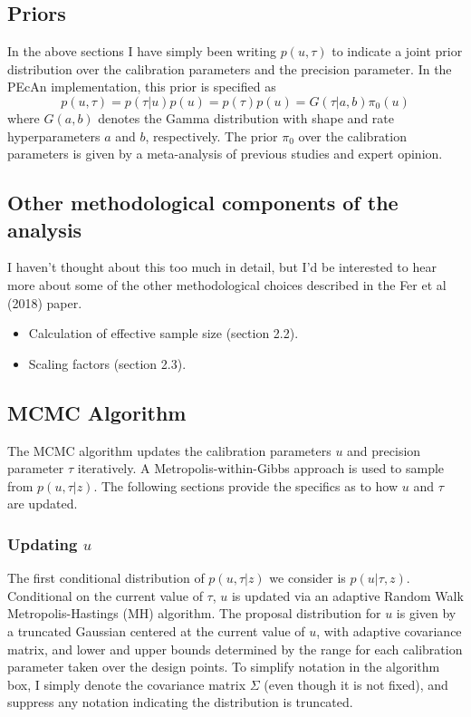 \documentclass[12pt]{article}
\begin{document}
\subsection{Priors}
In the above sections I have simply been writing $p(u, \tau)$ to indicate a joint prior distribution over the calibration parameters and the precision parameter. In the PEcAn implementation, 
this prior is specified as
\[p(u, \tau) = p(\tau|u)p(u) = p(\tau)p(u) = G(\tau|a, b)\pi_0(u)\]
where $G(a, b)$ denotes the Gamma distribution with shape and rate hyperparameters $a$ and $b$, respectively. The prior $\pi_0$ over the calibration parameters is given by a meta-analysis
of previous studies and expert opinion. 

\subsection{Other methodological components of the analysis}
I haven't thought about this too much in detail, but I'd be interested to hear more about some of the other methodological choices described in the Fer et al (2018) paper. 
\begin{itemize}
\item Calculation of effective sample size (section 2.2).
\item Scaling factors (section 2.3). 
\end{itemize}

\subsection{MCMC Algorithm}
The MCMC algorithm updates the calibration parameters $u$ and precision parameter $\tau$ iteratively. A Metropolis-within-Gibbs approach is used to sample from $p(u, \tau|z)$. The following sections
provide the specifics as to how $u$ and $\tau$ are updated. 

\subsubsection{Updating $u$}
The first conditional distribution of $p(u, \tau|z)$ we consider is $p(u|\tau, z)$. Conditional on the current value of $\tau$, $u$ is updated via an adaptive Random Walk Metropolis-Hastings (MH) algorithm. The proposal 
distribution for $u$ is given by a truncated Gaussian centered at the current value of $u$, with adaptive covariance matrix, and lower and upper bounds determined by the range for each calibration parameter taken over the design points. To simplify notation in the algorithm box, I simply denote the covariance matrix $\Sigma$ (even though it is not fixed), and suppress any notation indicating the distribution is truncated. 
\end{document}
